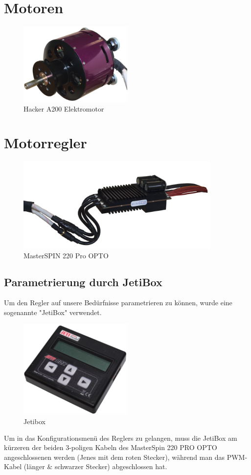 \section{Motoren}
\begin{figure}[h]
    \centering
    \includegraphics[width=0.5\textwidth]{Fotos/Motor.png}
    \caption{Hacker A200 Elektromotor}
\end{figure}
\newpage
\section{Motorregler}
\begin{figure}[h]
    \centering
    \includegraphics[width=0.9\textwidth]{Fotos/MasterSpin_ohne_Halter.png}
    \caption{MasterSPIN 220 Pro OPTO}
\end{figure}
\subsection{Parametrierung durch JetiBox}
Um den Regler auf unsere Bedürfnisse parametrieren zu können, wurde eine sogenannte "JetiBox" verwendet.
\begin{figure}[h]
    \centering
    \includegraphics[width=0.5\textwidth]{Fotos/JetiBox.png}
    \caption{Jetibox}
\end{figure}
\newpage
Um in das Konfigurationsmenü des Reglers zu gelangen, muss die JetiBox am kürzeren der beiden 3-poligen Kabeln des MasterSpin 220 PRO OPTO angeschlossenen werden (Jenes mit dem roten Stecker), 
während man das PWM-Kabel (länger \& schwarzer Stecker) abgeschlossen hat.\\

